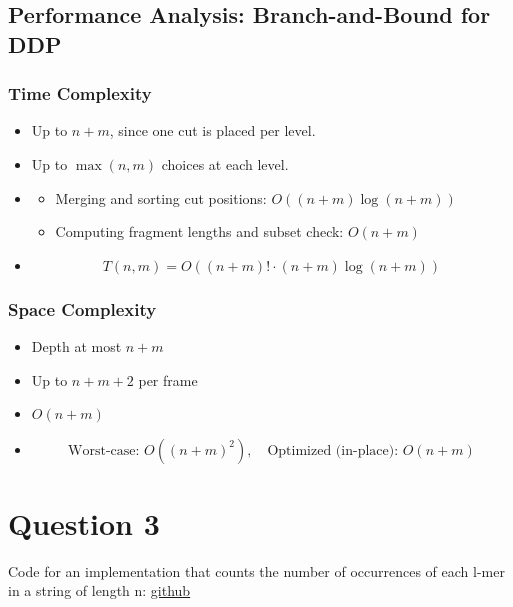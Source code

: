 \documentclass{article}
\begin{document}
\subsection*{Performance Analysis: Branch-and-Bound for DDP}



\subsubsection*{Time Complexity}

\begin{itemize}
  \item {} Up to $n + m$, since one cut is placed per level.
  \item {} Up to $\max(n, m)$ choices at each level.
  \item {}
    \begin{itemize}
      \item Merging and sorting cut positions: $O((n + m) \log(n + m))$
      \item Computing fragment lengths and subset check: $O(n + m)$
    \end{itemize}
  \item {}
    \[
      T(n, m) = O((n + m)! \cdot (n + m) \log(n + m))
    \]
\end{itemize}

\subsubsection*{Space Complexity}

\begin{itemize}
  \item {} Depth at most $n + m$
  \item {} Up to $n + m + 2$ per frame
  \item {} $O(n + m)$
  \item {}
    \[
      \text{Worst-case: } O((n + m)^2), \quad \text{Optimized (in-place): } O(n + m)
    \]
\end{itemize}

\section{Question 3}

Code for an implementation that counts the number of occurrences of each l-mer in a
string of length n: \href{https://github.com/fatimanawmi/CS238/blob/main/lmer.py}{github}
\end{document}
